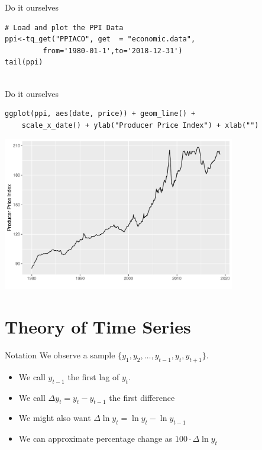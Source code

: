\begin{frame}[fragile]{Do it ourselves}
\begin{verbatim}
# Load and plot the PPI Data
ppi<-tq_get("PPIACO", get  = "economic.data",
         from='1980-01-1',to='2018-12-31')
tail(ppi)


\end{verbatim}
\end{frame}

\begin{frame}[fragile]{Do it ourselves}
\begin{verbatim}
ggplot(ppi, aes(date, price)) + geom_line() +
    scale_x_date() + ylab("Producer Price Index") + xlab("")
\end{verbatim}
\begin{center}
\includegraphics[width=4in]{./resources/ppi_plot.pdf}
\end{center}
\end{frame}





\section{Theory of Time Series}

\begin{frame}{Notation}
We observe a sample $\{y_1,y_2,\ldots,y_{t-1},y_{t},y_{t+1}\}$.
\begin{itemize}
\item We call $y_{t-1}$ the \alert{first lag} of $y_t$.
\item We call $\Delta y_{t} = y_{t} - y_{t-1}$ the \alert{first difference}
\item We might also want $\Delta \ln y_{t} = \ln y_{t} - \ln y_{t-1}$
\item We can approximate percentage change as  $100 \cdot \Delta \ln y_{t}$
\end{itemize}
\end{frame}

